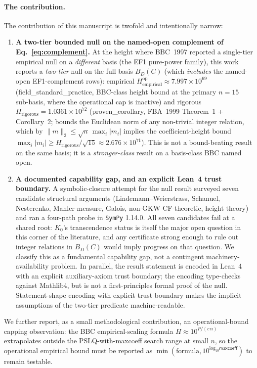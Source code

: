 \documentclass[11pt,a4paper]{article}
\newcommand{\K}{K_{0}}
\newcommand{\Hrig}{H_{\mathrm{rigorous}}}
\newcommand{\Hempop}{H_{\mathrm{empirical}}^{\mathrm{op}}}
\newcommand{\BDC}{B_{D}(C)}
\newcommand{\fsp}{\textsf{field\_standard\_practice}}
\newcommand{\pc}{\textsf{proven\_corollary}}
\begin{document}
\paragraph{The contribution.}
The contribution of this manuscript is twofold and intentionally narrow:
\begin{enumerate}[label=(\alph*),itemsep=2pt,topsep=2pt]
\item \textbf{A two-tier bounded null on the named-open complement of
  Eq.~\eqref{eq:complement}.}
  At the height where BBC~1997 reported a single-tier empirical null on a
  \emph{different} basis (the EF1 pure-power family), this work reports a
  \emph{two-tier} null on the full basis $\BDC$ (which \emph{includes} the
  named-open EF1-complement rows): empirical
  $\Hempop \approx 7.997\times 10^{69}$ (\fsp{}, BBC-class height
  bound at the primary $n=15$ sub-basis, where the operational cap is
  inactive) and rigorous
  $\Hrig = 1.0361\times 10^{72}$ (\pc{}, FBA~1999 Theorem~1 + Corollary~2;
  bounds the Euclidean norm of any non-trivial integer relation, which by
  $\|m\|_{2} \le \sqrt{n}\,\max_{i}|m_{i}|$ implies the coefficient-height
  bound $\max_{i}|m_{i}| \ge \Hrig/\sqrt{15} \approx 2.676\times 10^{71}$).
  This is not a bound-beating result on the same basis; it is a
  \emph{stronger-class} result on a basis-class BBC named open.

\item \textbf{A documented capability gap, and an explicit Lean~4 trust
  boundary.}
  A symbolic-closure attempt for the null result surveyed seven candidate
  structural arguments (Lindemann--Weierstrass, Schanuel, Nesterenko,
  Mahler-measure, Galois, non-GKW CF-theoretic, height theory) and ran a
  four-path probe in \texttt{SymPy} 1.14.0.
  All seven candidates fail at a shared root: $\K$'s transcendence status
  is itself the major open question in this corner of the literature, and any
  certificate strong enough to rule out integer relations in $\BDC$
  would imply progress on that question.
  We classify this as a fundamental capability gap, not a contingent
  machinery-availability problem.
  In parallel, the result statement is encoded in Lean~4 with an explicit
  auxiliary-axiom trust boundary; the encoding type-checks against Mathlib4,
  but is not a first-principles formal proof of the null.
  Statement-shape encoding with explicit trust boundary makes the implicit
  assumptions of the two-tier predicate machine-readable.
\end{enumerate}

We further report, as a small methodological contribution, an
operational-bound capping observation: the BBC empirical-scaling formula
$H \approx 10^{P/(c\,n)}$
extrapolates outside the PSLQ-with-\textsf{maxcoeff} search range at small
$n$, so the operational empirical bound must be reported as
$\min(\text{formula}, 10^{\log_{10}\textsf{maxcoeff}})$
to remain testable.
\end{document}
